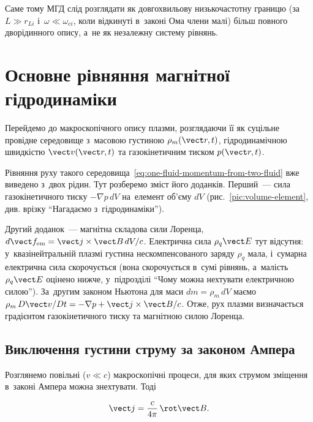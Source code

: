 Саме тому МГД слід розглядати як довгохвильову низькочастотну границю (за $L\gg r_{Li}$ і~$\omega\ll\omega_{ci}$, коли відкинуті в~законі Ома члени малі) більш повного
дворідинного опису, а~не як незалежну систему рівнянь.


\section{Основне рівняння магнітної гідродинаміки}


Перейдемо до макроскопічного опису плазми, розглядаючи її як суцільне провідне середовище
з~масовою густиною $\rho_m(\vect r,t)$, гідродинамічною швидкістю $\vect v(\vect r,t)$ та
газокінетичним тиском $p(\vect r,t)$.

Рівняння руху такого середовища~\eqref{eq:one-fluid-momentum-from-two-fluid} вже виведено з~двох рідин. Тут
розберемо зміст його доданків. Перший~--- сила газокінетичного тиску $-\nabla p\,dV$ на~елемент об'єму $dV$
(рис.~\ref{pic:volume-element}, див. врізку \enquote{Нагадаємо з~гідродинаміки}).

Другий доданок~--- магнітна складова сили Лоренца, $d\vect f_{\mathrm{em}}=\vect j\times\vect B\,dV/c$.
Електрична сила $\rho_q\vect E$ тут відсутня: у~квазінейтральній плазмі густина нескомпенсованого
заряду $\rho_q$ мала, і~сумарна електрична сила скорочується (вона скорочується в~сумі рівнянь, а~малість $\rho_q\vect E$ оцінено нижче, у~підрозділі \enquote{Чому можна нехтувати електричною силою}). За~другим законом Ньютона для маси
$dm=\rho_m\,dV$ маємо $\rho_m\,D\vect v/Dt=-\nabla p+\vect j\times\vect B/c$. Отже, рух плазми визначається градієнтом
газокінетичного тиску та магнітною силою Лоренца.



\subsection*{Виключення густини струму за законом Ампера}


Розглянемо повільні ($v\ll c$) макроскопічні процеси, для яких струмом зміщення в~законі Ампера можна
знехтувати. Тоді

\begin{equation*}
    \vect j=\frac{c}{4\pi}\,\rot\vect B.
\end{equation*}

